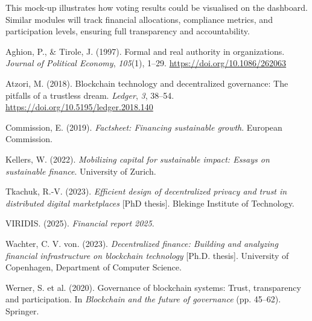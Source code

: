 \documentclass[
  english,
  12pt,
  oneside,
  open=any]{scrbook}
\newlength{\cslhangindent}
\newenvironment{CSLReferences}[2] %
 {\begin{list}{}{%
  \setlength{\itemindent}{0pt}
  \setlength{\leftmargin}{0pt}
  \setlength{\parsep}{0pt}
  \ifodd #1
   \setlength{\leftmargin}{\cslhangindent}
   \setlength{\itemindent}{-1\cslhangindent}
  \fi
  \setlength{\itemsep}{#2\baselineskip}}}
 {\end{list}}
\begin{document}
This mock-up illustrates how voting results could be visualised on the
dashboard. Similar modules will track financial allocations, compliance
metrics, and participation levels, ensuring full transparency and
accountability.

\label{refs}
\begin{CSLReferences}{1}{0}
Aghion, P., \& Tirole, J. (1997). Formal and real authority in
organizations. \emph{Journal of Political Economy}, \emph{105}(1),
1--29. \url{https://doi.org/10.1086/262063}

Atzori, M. (2018). Blockchain technology and decentralized governance:
The pitfalls of a trustless dream. \emph{Ledger}, \emph{3}, 38--54.
\url{https://doi.org/10.5195/ledger.2018.140}

Commission, E. (2019). \emph{Factsheet: Financing sustainable growth}.
European Commission.

Kellers, W. (2022). \emph{Mobilizing capital for sustainable impact:
Essays on sustainable finance}. University of Zurich.

Tkachuk, R.-V. (2023). \emph{Efficient design of decentralized privacy
and trust in distributed digital marketplaces} {[}PhD thesis{]}.
Blekinge Institute of Technology.

VIRIDIS. (2025). \emph{Financial report 2025}.

Wachter, C. V. von. (2023). \emph{Decentralized finance: Building and
analyzing financial infrastructure on blockchain technology} {[}Ph.D.
thesis{]}. University of Copenhagen, Department of Computer Science.

Werner, S. et al. (2020). Governance of blockchain systems: Trust,
transparency and participation. In \emph{Blockchain and the future of
governance} (pp. 45--62). Springer.

\end{CSLReferences}


\backmatter
\end{document}
